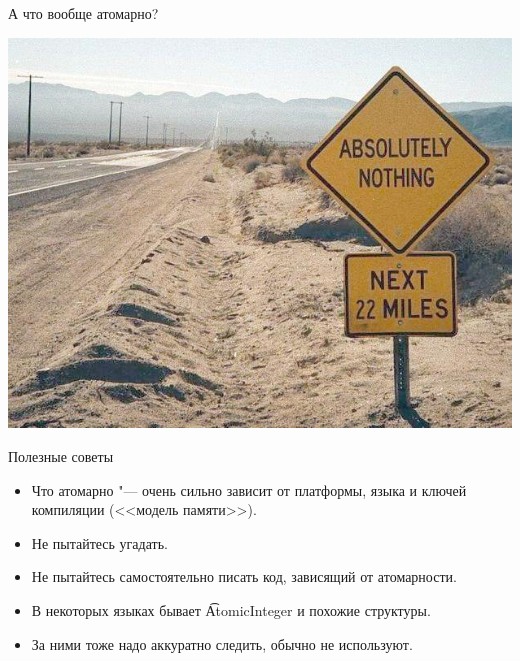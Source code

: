 \begin{frame}{А что вообще атомарно?}
	\begin{center}
		\includegraphics[scale=0.4]{absolutely-nothing.jpg}
	\end{center}
\end{frame}

\begin{frame}{Полезные советы}
	\begin{itemize}
		\item
			Что атомарно "--- очень сильно зависит от платформы, языка и ключей компиляции
			(<<модель памяти>>).
		\item Не пытайтесь угадать.
		\item Не пытайтесь самостоятельно писать код, зависящий от атомарности.
		\item В некоторых языках бывает \t{AtomicInteger} и похожие структуры.
		\item За ними тоже надо аккуратно следить, обычно не используют.
	\end{itemize}
\end{frame}
